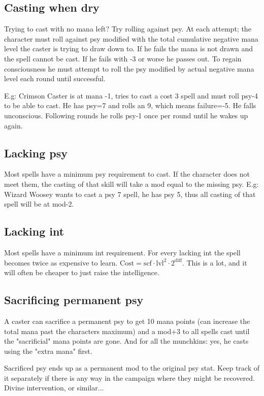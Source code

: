 \subsection*{Casting when dry}
Trying to cast with no mana left? Try rolling against psy. At each attempt; the character must roll against psy modified with the total cumulative negative mana level the caster is trying to draw down to. If he fails the mana is not drawn and the spell cannot be cast. If he fails with -3 or worse he passes out. To regain consciousness he must attempt to roll the psy modified by actual negative mana level each round until successful.

E.g: Crimson Caster is at mana -1, tries to cast a cost 3 spell and must roll psy-4 to be able to cast. He has psy=7 and rolls an 9, which means failure=-5. He falls unconscious. Following rounds he rolls psy-1 once per round until he wakes up again.


\subsection*{Lacking psy}
Most spells have a minimum psy requirement to cast. If the character does not meet them, the casting of that skill will take a mod equal to the missing psy.
E.g: Wizard Woosey wants to cast a psy 7 spell, he has psy 5, thus all casting of that spell will be at mod-2.


\subsection*{Lacking int}
Most spells have a minimum int requirement. For every lacking int the spell becomes twice as expensive to learn. $\mathrm{Cost} = \mathrm{scf} \cdot \mathrm{lvl}^2 \cdot 2^{\mathrm{diff}}$. This is a lot, and it will often be cheaper to just raise the intelligence.


\subsection*{Sacrificing permanent psy}
A caster can sacrifice a permanent psy to get 10 mana points (can increase the total mana past the characters maximum) and a mod+3 to all spells cast until the "sacrificial" mana points are gone. And for all the munchkins: yes, he casts using the "extra mana" first.

Sacrificed psy ends up as a permanent mod to the original psy stat. Keep track of it separately if there is any way in the campaign where they might be recovered. Divine intervention, or similar...

